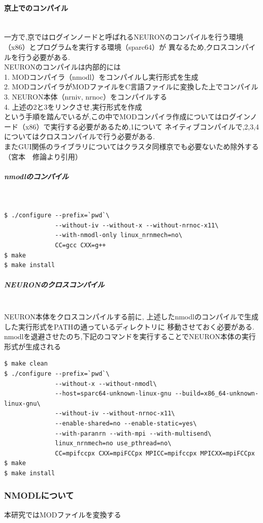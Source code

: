 \paragraph{京上でのコンパイル}~\\
一方で,京ではログインノードと呼ばれるNEURONのコンパイルを行う環境（x86）とプログラムを実行する環境（sparc64）が
異なるため,クロスコンパイルを行う必要がある.\\
NEURONのコンパイルは内部的には\\
1. MODコンパイラ（nmodl）をコンパイルし実行形式を生成\\
2. MODコンパイラがMODファイルをC言語ファイルに変換した上でコンパイル\\
3. NEURON本体（nrniv, nrnoc）をコンパイルする\\
4. 上述の2と3をリンクさせ,実行形式を作成\\
という手順を踏んでいるが,この中でMODコンパイラ作成についてはログインノード（x86）で実行する必要があるため,1について
ネイティブコンパイルで,2,3,4についてはクロスコンパイルで行う必要がある.\\
またGUI関係のライブラリについてはクラスタ同様京でも必要ないため除外する（宮本　修論より引用）\\
\subparagraph{nmodlのコンパイル}~\\
{\footnotesize
\begin{lstlisting}[caption=京でのnmodlのコンパイル,label=k-nmodl-compile,numbers=none]
$ ./configure --prefix=`pwd`\
              --without-iv --without-x --without-nrnoc-x11\
              --with-nmodl-only linux_nrnmech=no\
              CC=gcc CXX=g++
$ make
$ make install
\end{lstlisting}
}
\subparagraph{NEURONのクロスコンパイル}~\\
NEURON本体をクロスコンパイルする前に, 上述したnmodlのコンパイルで生成した実行形式をPATHの通っているディレクトリに
移動させておく必要がある. nmodlを退避させたのち,下記のコマンドを実行することでNEURON本体の実行形式が生成される
{\footnotesize
\begin{lstlisting}[caption=京でのNEURON本体のコンパイル,label=k-neuron-compile,numbers=none]
$ make clean
$ ./configure --prefix=`pwd`\
              --without-x --without-nmodl\
              --host=sparc64-unknown-linux-gnu --build=x86_64-unknown-linux-gnu\
              --without-iv --without-nrnoc-x11\
              --enable-shared=no --enable-static=yes\
              --with-paranrn --with-mpi --with-multisend\
              linux_nrnmech=no use_pthread=no\
              CC=mpifccpx CXX=mpiFCCpx MPICC=mpifccpx MPICXX=mpiFCCpx
$ make
$ make install
\end{lstlisting}
}

\subsubsection{NMODLについて}
本研究ではMODファイルを変換する
